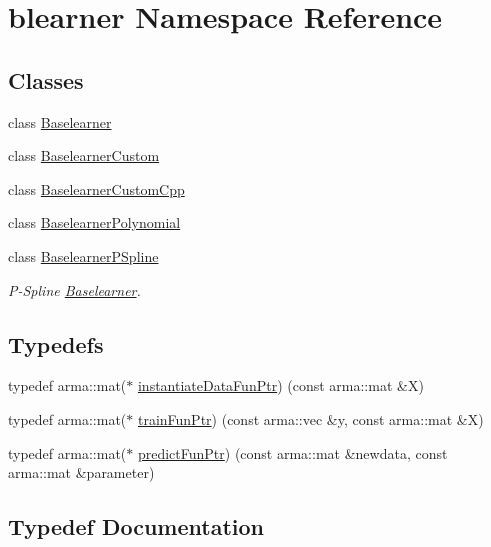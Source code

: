 \hypertarget{namespaceblearner}{}\section{blearner Namespace Reference}
\label{namespaceblearner}
\subsection*{Classes}
\begin{DoxyCompactItemize}
\item 
class \hyperlink{classblearner_1_1_baselearner}{Baselearner}
\item 
class \hyperlink{classblearner_1_1_baselearner_custom}{Baselearner\+Custom}
\item 
class \hyperlink{classblearner_1_1_baselearner_custom_cpp}{Baselearner\+Custom\+Cpp}
\item 
class \hyperlink{classblearner_1_1_baselearner_polynomial}{Baselearner\+Polynomial}
\item 
class \hyperlink{classblearner_1_1_baselearner_p_spline}{Baselearner\+P\+Spline}
\begin{DoxyCompactList}\small\item\em P-\/\+Spline \hyperlink{classblearner_1_1_baselearner}{Baselearner}. \end{DoxyCompactList}\end{DoxyCompactItemize}
\subsection*{Typedefs}
\begin{DoxyCompactItemize}
\item 
typedef arma\+::mat($\ast$ \hyperlink{namespaceblearner_a10cec16134a934fb9defbdc2c2011f2a}{instantiate\+Data\+Fun\+Ptr}) (const arma\+::mat \&X)
\item 
typedef arma\+::mat($\ast$ \hyperlink{namespaceblearner_a5e2b38edf05e32681bee136af9ae505d}{train\+Fun\+Ptr}) (const arma\+::vec \&y, const arma\+::mat \&X)
\item 
typedef arma\+::mat($\ast$ \hyperlink{namespaceblearner_a93d5b51440d434704d2bde9dee652f6e}{predict\+Fun\+Ptr}) (const arma\+::mat \&newdata, const arma\+::mat \&parameter)
\end{DoxyCompactItemize}


\subsection{Typedef Documentation}
\mbox{\label{namespaceblearner_a10cec16134a934fb9defbdc2c2011f2a}} 
